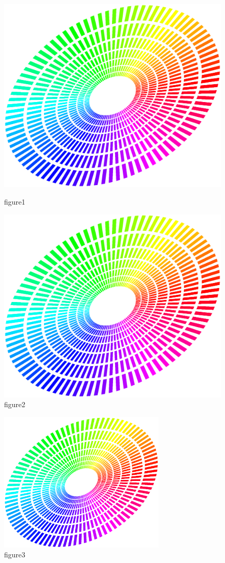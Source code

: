 \documentclass[oneside]{ecsthesis}       %
\begin{document}
\begin{figure}[!htb]
	\centering
	\begin{minipage}[b]{0.45\textwidth}
		\centering
		\includegraphics[width=0.8\linewidth]{figure}
		\caption{figure1}
		\label{fig:figure1}
	\end{minipage}
	\hfill
	\begin{minipage}[b]{0.45\textwidth}
		\centering
		\includegraphics[width=0.6\linewidth]{figure}
		\caption{figure2}
		\label{fig:figure2}
	\end{minipage}
\end{figure}

\begin{figure}[!htb]
	\centering
	\includegraphics[width=8cm]{figure}
	\caption{figure3}
	\label{Figure:figure3}
\end{figure}
\end{document}
